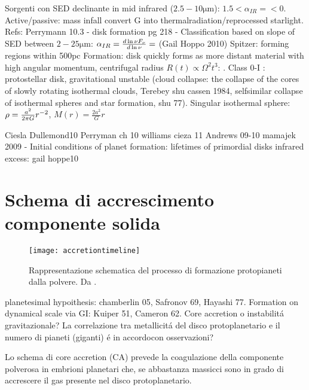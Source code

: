 \begin{workout}
Sorgenti con SED declinante in mid infrared ($2.5-10\si{\micro\meter}$): $1.5<\alpha_{IR}=<0$. Active/passive: mass infall convert G into thermalradiation/reprocessed starlight.
Refs: Perrymann 10.3 - disk formation pg 218 - 
Classification based on slope of SED between $2-25\si{\micro\meter}$: $\alpha_{IR}=\frac{d \ln{\nu F_{\nu}}}{d \ln{\nu}}=$ (Gail Hoppo 2010)
Spitzer: forming regions within 500pc
Formation: disk quickly forms as more distant material with high angular momentum, centrifugal radius $R(t)\propto\Omega^2 t^3$: . Class 0-I : protostellar disk, gravitational unstable (cloud collapse: the collapse of the cores of slowly rotating isothermal clouds, Terebey shu cassen 1984, selfsimilar collapse of isothermal spheres and star formation, shu 77). Singular isothermal sphere: $\rho=\frac{a^2}{2\pi G}r^{-2}$, $M(r)=\frac{2a^2}{G}r$
\end{workout}

\begin{workout}
Ciesla Dullemond10 
Perryman ch 10
williams cieza 11
Andrews 09-10
mamajek 2009 - Initial conditions of planet formation: lifetimes of primordial disks
infrared excess: gail hoppe10
\end{workout}

{\let\clearpage\relax\let\cleardoublepage\relax
\chapter{Schema di accrescimento componente solida}
}


\begin{figure}[!ht]
\texttt{[image: accretiontimeline]}\caption{Rappresentazione schematica del processo di formazione protopianeti dalla polvere. Da \cite{perryman2011exoplanet}.}\label{fig:accretiontimeline}
\end{figure}

\begin{workout}[Refs GI vs CA]
planetesimal hypoithesis: chamberlin 05, Safronov 69, Hayashi 77. Formation on dynamical scale via GI: Kuiper 51, Cameron 62.
Core accretion o instabilit\'a gravitazionale?
La correlazione tra metallicit\'a del disco protoplanetario e il numero di pianeti (giganti) \'e in accordocon osservazioni?
\end{workout}


Lo schema di core accretion (CA) prevede la coagulazione della componente polverosa in embrioni planetari che, se abbastanza massicci sono in grado di accrescere il gas presente nel disco protoplanetario.

